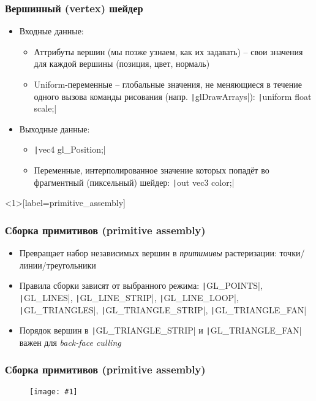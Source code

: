 \documentclass[10pt]{beamer}
\newcommand{\slideimage}[1]{
  \begin{figure}
    \begin{adjustbox}{width=\textwidth, totalheight=\textheight-2\baselineskip-2\baselineskip,keepaspectratio}
      \texttt{[image: \#1]}
    \end{adjustbox}
  \end{figure}
}
\begin{document}
\begin{frame}[fragile]
\frametitle{Вершинный (vertex) шейдер}
\begin{itemize}
\pause
\item Входные данные:
\pause
\begin{itemize}
\item Аттрибуты вершин (мы позже узнаем, как их задавать) -- свои значения для каждой вершины (позиция, цвет, нормаль)
\pause
\item Uniform-переменные -- глобальные значения, не меняющиеся в течение одного вызова команды рисования (напр. \texttt|glDrawArrays|):
\texttt|uniform float scale;|
\end{itemize}
\pause
\item Выходные данные:
\begin{itemize}
\item \texttt|vec4 gl_Position;|
\pause
\item Переменные, интерполированное значение которых попадёт во фрагментный (пиксельный) шейдер: \texttt|out vec3 color;|
\end{itemize}
\end{itemize}
\end{frame}

\begin{frame}<1>[label=primitive_assembly]
\frametitle{Сборка примитивов (primitive assembly)}
\begin{itemize}
\item Превращает набор независимых вершин в \textit{притимивы} растеризации: точки/линии/треугольники
\item Правила сборки зависят от выбранного режима: \texttt|GL_POINTS|, \texttt|GL_LINES|, \texttt|GL_LINE_STRIP|, \texttt|GL_LINE_LOOP|, \texttt|GL_TRIANGLES|, \texttt|GL_TRIANGLE_STRIP|, \texttt|GL_TRIANGLE_FAN|
\pause
\item Порядок вершин в \texttt|GL_TRIANGLE_STRIP| и \texttt|GL_TRIANGLE_FAN| важен для \textit{back-face culling}
\end{itemize}
\end{frame}

\begin{frame}
\frametitle{Сборка примитивов (primitive assembly)}
\slideimage{primitives.png}
\end{frame}

\end{document}
